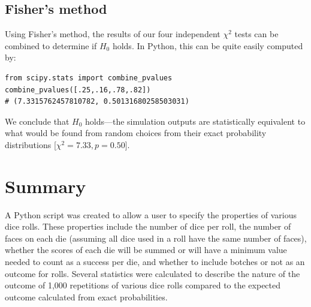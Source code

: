 \documentclass{article}
\begin{document}

\subsection{Fisher's method}

Using Fisher's method, the results of our four independent $\chi^2$ tests can be combined to determine if $H_0$ holds. In Python, this can be quite easily computed by:
\\
\begin{lstlisting}
from scipy.stats import combine_pvalues
combine_pvalues([.25,.16,.78,.82])
# (7.3315762457810782, 0.50131680258503031)
\end{lstlisting}
We conclude that $H_0$ holds---the simulation outputs are statistically equivalent to what would be found from random choices from their exact probability distributions [$\chi^2=7.33, p=0.50$].

\section{Summary}
A Python script was created to allow a user to specify the properties of various dice rolls. These properties include the number of dice per roll, the number of faces on each die (assuming all dice used in a roll have the same number of faces), whether the scores of each die will be summed or will have a minimum value needed to count as a success per die, and whether to include botches or not as an outcome for rolls. Several statistics were calculated to describe the nature of the outcome of 1,000 repetitions of various dice rolls compared to the expected outcome calculated from exact probabilities.
\end{document}
